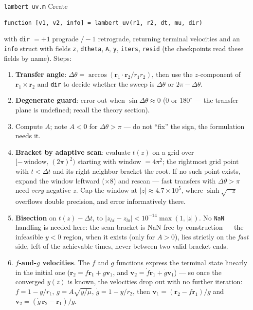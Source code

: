 \documentclass[11pt,letterpaper]{article}
\newcommand{\rvec}{\mathbf{r}}
\newcommand{\dth}{\Delta\theta}
\begin{document}
\begin{exercise}{\texttt{lambert\_uv.m}}
Create
\begin{verbatim}
function [v1, v2, info] = lambert_uv(r1, r2, dt, mu, dir)
\end{verbatim}
with \texttt{dir} $=+1$ prograde $/-1$ retrograde, returning terminal
velocities and an \texttt{info} struct with fields \texttt{z},
\texttt{dtheta}, \texttt{A}, \texttt{y}, \texttt{iters}, \texttt{resid}
(the checkpoints read these fields by name). Steps:
\begin{enumerate}[leftmargin=1.5em,nosep]
\item \textbf{Transfer angle}: $\dth = \arccos(\rvec_1\cdot\rvec_2/r_1r_2)$,
      then use the $z$-component of $\rvec_1\times\rvec_2$ and \texttt{dir}
      to decide whether the sweep is $\dth$ or $2\pi - \dth$.
\item \textbf{Degenerate guard}: error out when $\sin\dth \approx 0$
      (0 or $180^\circ$ --- the transfer plane is undefined; recall the
      theory section).
\item Compute $A$; note $A < 0$ for $\dth > \pi$ --- do not ``fix'' the
      sign, the formulation needs it.
\item \textbf{Bracket by adaptive scan}: evaluate $t(z)$ on a grid over
      $[-\,\text{window},\,(2\pi)^2)$ starting with window $= 4\pi^2$; the
      rightmost grid point with $t < \Delta t$ and its right neighbor
      bracket the root. If no such point exists, expand the window
      leftward ($\times 8$) and rescan --- fast transfers with $\dth >
      \pi$ need \emph{very} negative $z$. Cap the window at
      $|z| \approx 4.7\times10^{5}$, where $\sinh\sqrt{-z}$ overflows
      double precision, and error informatively there.
\item \textbf{Bisection} on $t(z) - \Delta t$, to $|z_{hi}-z_{lo}| <
      10^{-14}\max(1,|z|)$. No \texttt{NaN} handling is needed here: the
      scan bracket is NaN-free by construction --- the infeasible $y<0$
      region, when it exists (only for $A>0$), lies strictly on the
      \emph{fast} side, left of the achievable times, never between two
      valid bracket ends.
\item \textbf{$f$-and-$g$ velocities}. The $f$ and $g$ functions express
      the terminal state linearly in the initial one
      ($\rvec_2 = f\rvec_1 + g\mathbf v_1$, and
      $\mathbf v_2 = \dot f\rvec_1 + \dot g\mathbf v_1$) --- so once the
      converged $y(z)$ is known, the velocities drop out with no further
      iteration:
      $f = 1 - y/r_1$, $g = A\sqrt{y/\mu}$, $\dot g = 1 - y/r_2$, then
      $\mathbf v_1 = (\rvec_2 - f\rvec_1)/g$ and
      $\mathbf v_2 = (\dot g\,\rvec_2 - \rvec_1)/g$.
\end{enumerate}
\end{exercise}
\end{document}
